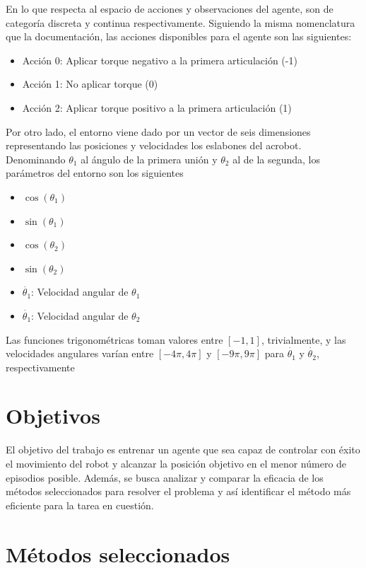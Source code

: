 \documentclass[12pt]{article}
\begin{document}
	En lo que respecta al espacio de acciones y observaciones del agente, son de categoría discreta y continua respectivamente. Siguiendo la misma nomenclatura que la documentación, las acciones disponibles para el agente son las siguientes:
	\begin{itemize}
		\item Acción 0: Aplicar torque negativo a la primera articulación (-1)
		\item Acción 1: No aplicar torque (0)
		\item Acción 2: Aplicar torque positivo a la primera articulación (1)
	\end{itemize}
	Por otro lado, el entorno viene dado por un vector de seis dimensiones representando las posiciones y velocidades los eslabones del acrobot. Denominando $\theta_1$ al ángulo de la primera unión y $\theta_2$ al de la segunda, los parámetros del entorno son los siguientes
	\begin{itemize}
		\item $\cos{(\theta_1)}$
		\item $\sin{(\theta_1)}$
		\item $\cos{(\theta_2)}$
		\item $\sin{(\theta_2)}$
		\item $\dot{\theta_1}$: Velocidad angular de $\theta_1$ 
		\item $\dot{\theta_1}$: Velocidad angular de $\theta_2$
	\end{itemize}
	Las funciones trigonométricas toman valores entre $[-1,1]$, trivialmente, y las velocidades angulares varían entre $[-4\pi,4\pi]$ y $[-9\pi, 9\pi]$ para $\dot{\theta_1}$ y $\dot{\theta_2}$, respectivamente
	
	
	\section{Objetivos}
	
	El objetivo del trabajo es entrenar un agente que sea capaz de controlar con éxito el movimiento del robot y alcanzar la posición objetivo en el menor número de episodios posible. Además, se busca analizar y comparar la eficacia de los métodos seleccionados para resolver el problema y así identificar el método más eficiente para la tarea en cuestión.
	
	\section{Métodos seleccionados}
	
\end{document}
